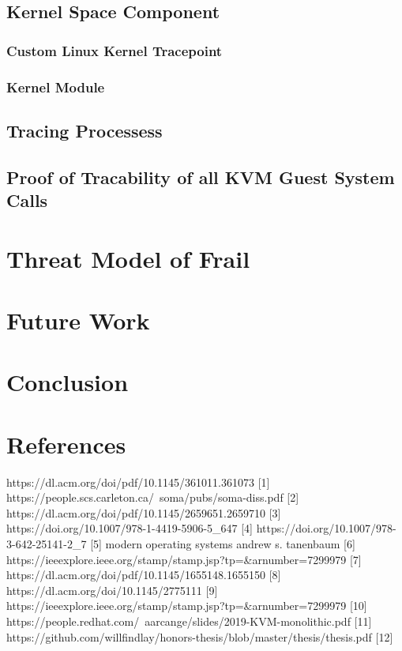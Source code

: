 \documentclass{report}
\begin{document}
\begin{spacing}{1.5}
\section{Kernel Space Component}
\subsection{Custom Linux Kernel Tracepoint}
\subsection{Kernel Module}
\section{Tracing Processess}
\section{Proof of Tracability of all KVM Guest System Calls}

\chapter{Threat Model of Frail}


\chapter{Future Work}

\chapter{Conclusion}

\chapter{References}

{\large
https://dl.acm.org/doi/pdf/10.1145/361011.361073 [1]
https://people.scs.carleton.ca/~soma/pubs/soma-diss.pdf [2]
https://dl.acm.org/doi/pdf/10.1145/2659651.2659710 [3]
https://doi.org/10.1007/978-1-4419-5906-5\_647 [4]
https://doi.org/10.1007/978-3-642-25141-2\_7 [5]
modern operating systems andrew s. tanenbaum [6]
https://ieeexplore.ieee.org/stamp/stamp.jsp?tp=\&arnumber=7299979 [7]
https://dl.acm.org/doi/pdf/10.1145/1655148.1655150 [8]
https://dl.acm.org/doi/10.1145/2775111 [9]
https://ieeexplore.ieee.org/stamp/stamp.jsp?tp=\&arnumber=7299979 [10]
https://people.redhat.com/~aarcange/slides/2019-KVM-monolithic.pdf [11]
https://github.com/willfindlay/honors-thesis/blob/master/thesis/thesis.pdf [12]
}
\end{spacing}
\end{document}
